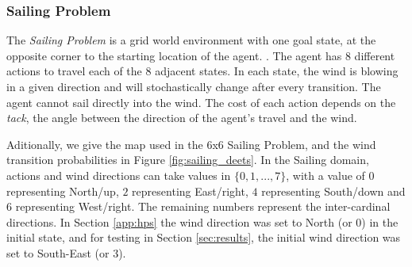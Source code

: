         \subsubsection{Sailing Problem}
            The \emph{Sailing Problem} is a grid world environment with one goal state, at the opposite corner to the starting location of the agent. %
            . The agent has 8 different actions to travel each of the 8 adjacent states. In each state, the wind is blowing in a given direction and will stochastically change after every transition. The agent cannot sail directly into the wind. The cost of each action depends on the \textit{tack}, the angle between the direction of the agent's travel and the wind. 



            Aditionally, we give the map used in the 6x6 Sailing Problem, and the wind transition probabilities in Figure \ref{fig:sailing_deets}. In the Sailing domain, actions and wind directions can take values in $\{0,1,...,7\}$, with a value of $0$ representing North/up, $2$ representing East/right, $4$ representing South/down and $6$ representing West/right. The remaining numbers represent the inter-cardinal directions. In Section \ref{app:hps} the wind direction was set to North (or $0$) in the initial state, and for testing in Section \ref{sec:results}, the initial wind direction was set to South-East (or $3$).

